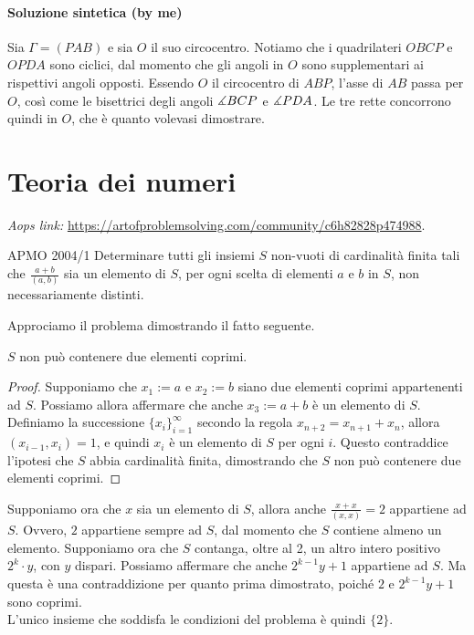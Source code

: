 \documentclass{article}
\begin{document}
\paragraph{Soluzione sintetica (by me)}

Sia $\Gamma=(PAB)$ e sia $O$ il suo circocentro.
Notiamo che i quadrilateri $OBCP$ e $OPDA$ sono ciclici, dal momento
che gli angoli in $O$ sono supplementari ai rispettivi angoli opposti.
Essendo $O$ il circocentro di $ABP$, l'asse di $AB$ passa per $O$,
così come le bisettrici degli angoli $\measuredangle{BCP}$ e $\measuredangle{PDA}$.
Le tre rette concorrono quindi in $O$, che è quanto volevasi
dimostrare.

\pagebreak
\section{Teoria dei numeri}

\textit{Aops link:}
\href{https://artofproblemsolving.com/community/c6h82828p474988}
{https://artofproblemsolving.com/community/c6h82828p474988}.

\begin{proposition}{APMO 2004/1}{}
	Determinare tutti gli insiemi $S$ non-vuoti di cardinalità finita
	tali che $\frac{a+b}{(a,b)}$ sia un elemento di $S$, per ogni scelta di
	elementi $a$ e $b$ in $S$, non necessariamente distinti.
\end{proposition}

Approciamo il problema dimostrando il fatto seguente.

\begin{claim*}{}{}
	$S$ non può contenere due elementi coprimi.
\end{claim*}
\begin{proof}
	Supponiamo che $x_1:=a$ e $x_2:=b$
	siano due elementi coprimi appartenenti ad $S$.
	Possiamo allora affermare che anche $x_3:=a+b$ è un elemento di $S$.
	Definiamo la successione
	$\{ x_i \}_{i=1}^{\infty}$ secondo la regola $x_{n+2}=x_{n+1}+x_n$,
	allora $(x_{i-1},x_{i})=1$, e quindi $x_i$ è un elemento di $S$
	per ogni $i$. Questo contraddice l'ipotesi che $S$ abbia cardinalità
	finita, dimostrando che $S$ non può contenere due elementi coprimi.
\end{proof}

Supponiamo ora che $x$ sia un elemento di $S$, allora anche
$\frac{x+x}{(x,x)}=2$ appartiene ad $S$. Ovvero, $2$ appartiene
sempre ad $S$, dal momento che $S$ contiene almeno un elemento.
Supponiamo ora che $S$ contanga, oltre al 2, un altro intero positivo
$2^k\cdot y$, con $y$ dispari. Possiamo affermare che anche
$2^{k-1}y+1$ appartiene ad $S$. Ma questa è una contraddizione
per quanto prima dimostrato,
poiché $2$ e $2^{k-1}y+1$ sono coprimi.\\
L'unico insieme che soddisfa le condizioni del problema
è quindi $\{ 2\}$.
\end{document}
